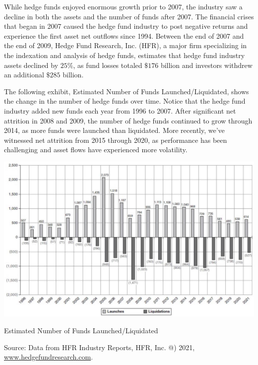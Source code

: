 \documentclass[11pt]{article}
\begin{document}
While hedge funds enjoyed enormous growth prior to 2007, the industry saw a decline in both the assets and the number of funds after 2007. The financial crises that began in 2007 caused the hedge fund industry to post negative returns and experience the first asset net outflows since 1994. Between the end of 2007 and the end of 2009, Hedge Fund Research, Inc. (HFR), a major firm specializing in the indexation and analysis of hedge funds, estimates that hedge fund industry assets declined by $25 \%$, as fund losses totaled $\$ 176$ billion and investors withdrew an additional $\$ 285$ billion.

The following exhibit, Estimated Number of Funds Launched/Liquidated, shows the change in the number of hedge funds over time. Notice that the hedge fund industry added new funds each year from 1996 to 2007. After significant net attrition in 2008 and 2009, the number of hedge funds continued to grow through 2014, as more funds were launched than liquidated. More recently, we've witnessed net attrition from 2015 through 2020, as performance has been challenging and asset flows have experienced more volatility.

\begin{center}
\includegraphics[max width=\textwidth]{2024_04_09_501764bcdced134762e2g-2}
\end{center}

Estimated Number of Funds Launched/Liquidated

Source: Data from HFR Industry Reports, HFR, Inc. @) 2021, \href{http://www.hedgefundresearch.com}{www.hedgefundresearch.com}.
\end{document}
